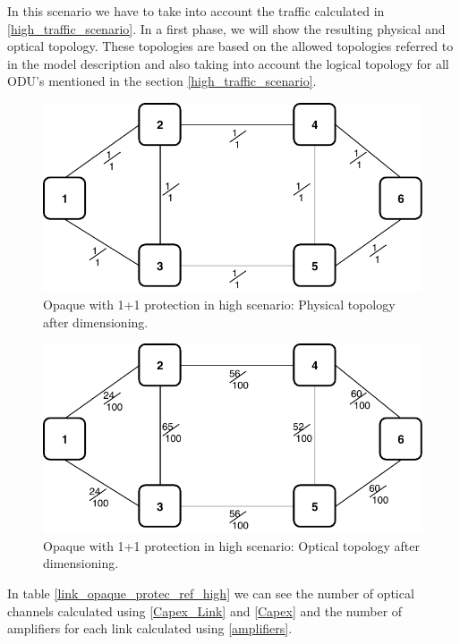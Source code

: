 In this scenario we have to take into account the traffic calculated in \ref{high_traffic_scenario}. In a first phase, we will show the resulting physical and optical topology. These topologies are based on the allowed topologies referred to in the model description and also taking into account the logical topology for all ODU's mentioned in the section \ref{high_traffic_scenario}.\\

\begin{figure}[h!]
\centering
\includegraphics[width=12cm]{sdf/ilp/opaque_protection/figures/physical_topology}
\caption{Opaque with 1+1 protection in high scenario: Physical topology after dimensioning.}
\label{physical_protectionhigh}
\end{figure}

\newpage
\begin{figure}[h!]
\centering
\includegraphics[width=12cm]{sdf/ilp/opaque_protection/figures/optical_topology_high}
\caption{Opaque with 1+1 protection in high scenario: Optical topology after dimensioning.}
\label{optical_protectionhigh}
\end{figure}

In table \ref{link_opaque_protec_ref_high} we can see the number of optical channels calculated using \ref{Capex_Link} and \ref{Capex} and the number of amplifiers for each link calculated using \ref{amplifiers}.

